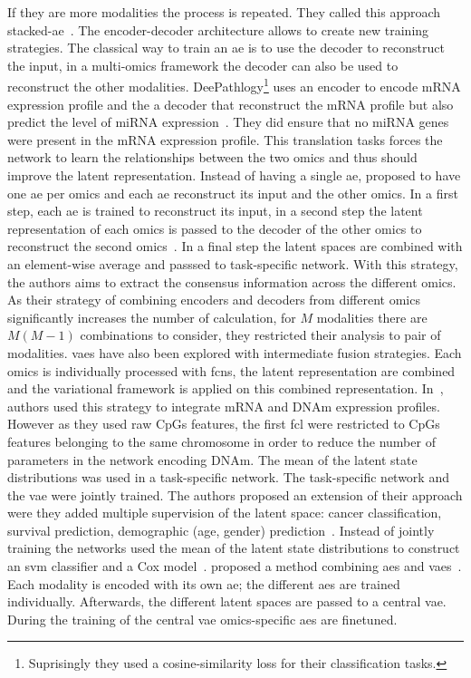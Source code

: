 \documentclass[../main.tex]{subfiles}
\begin{document}
		If they are more modalities the process is repeated.
		They called this approach stacked-\gls{ae}~\cite{Wu2022StackedAB}.
		The encoder-decoder architecture allows to create new training strategies.
		The classical way to train an \gls{ae} is to use the decoder to reconstruct the input, in a multi-omics framework the decoder can also be used to reconstruct the other modalities.
		DeePathlogy\footnote{Suprisingly they used a cosine-similarity loss for their classification tasks.} uses an encoder to encode mRNA expression profile and the a decoder that reconstruct the mRNA profile but also predict the level of miRNA expression~\cite{Azarkhalili2019}.
		They did ensure that no miRNA genes were present in the mRNA expression profile.
		This translation tasks forces the network to learn the relationships between the two omics and thus should improve the latent representation.
		Instead of having a single \gls{ae}, \citeauthor{CrossAE} proposed to have one \gls{ae} per omics and each \gls{ae} reconstruct its input and the other omics.
		In a first step, each \gls{ae} is trained to reconstruct its input, in a second step the latent representation of each omics is passed to the decoder of the other omics to reconstruct the second omics~\cite{CrossAE}.
		In a final step the latent spaces are combined with an element-wise average and passsed to task-specific network.
		With this strategy, the authors aims to extract the consensus information across the different omics.
		As their strategy of combining encoders and decoders from different omics significantly increases the number of calculation, for \(M\) modalities there are \(M(M-1)\) combinations to consider, they restricted their analysis to pair of modalities.
		\Glspl{vae} have also been explored with intermediate fusion strategies.
		Each omics is individually processed with \glspl{fcn}, the latent representation are combined and the variational framework is applied on this combined representation.
		In~\cite{Zhang2019}, authors used this strategy to integrate mRNA and DNAm expression profiles.
		However as they used raw CpGs features, the first \gls{fcl} were restricted to CpGs features belonging to the same chromosome in order to reduce the number of parameters in the network encoding DNAm.
		The mean of the latent state distributions was used in a task-specific network.
		The task-specific network and the \gls{vae} were jointly trained.
		The authors proposed an extension of their approach were they added multiple supervision of the latent space: cancer classification, survival prediction, demographic (age, gender) prediction~\cite{Zhang2021}.
		Instead of jointly training the networks \citeauthor{Hira2021} used the mean of the latent state distributions to construct an \gls{svm} classifier and a Cox model~\cite{Hira2021}.
		\citeauthor{customics} proposed a method combining \glspl{ae} and \glspl{vae}~\cite{customics}.
		Each modality is encoded with its own \gls{ae}; the different \glspl{ae} are trained individually.
		Afterwards, the different latent spaces are passed to a central \gls{vae}.
		During the training of the central \gls{vae} omics-specific \glspl{ae} are finetuned.
\end{document}
